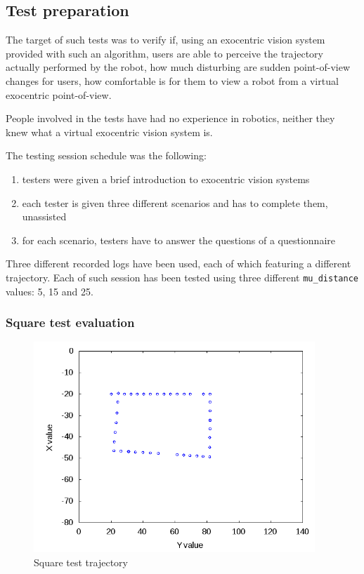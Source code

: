 \subsection{Test preparation}
\label{subsec:testpreparation}
%
The target of such tests was to verify  if, using 
an exocentric vision system provided with such an algorithm, 
users are able to perceive the trajectory actually 
performed by the robot,  how much disturbing are 
sudden point-of-view changes for users,  how 
comfortable is for them to view a robot from a 
virtual exocentric point-of-view.
%

%
People involved in the tests have had no experience in 
robotics, neither they knew what a virtual exocentric 
vision system is.
%

%
The testing session schedule was the following:
\begin{enumerate}
  \item testers were given a brief introduction to exocentric vision systems
  \item each tester is given three different scenarios and has to 
    complete them, unassisted
  \item for each scenario, testers have to answer the questions 
    of a questionnaire
\end{enumerate}
%

%
Three different recorded logs have been used, each of which featuring 
a different trajectory. Each of such session has been tested
using three different \texttt{mu\_distance} values: 5, 15 and 25. 
%
\subsubsection{Square test evaluation}
\label{subsubsec:squaretest}

\begin{figure}[!h]
  \begin{center}
    \includegraphics[width=300pt]{img/path_session_9.png}
    \caption{Square test trajectory}
    \label{fig:openglspace}
  \end{center}
\end{figure}
%


